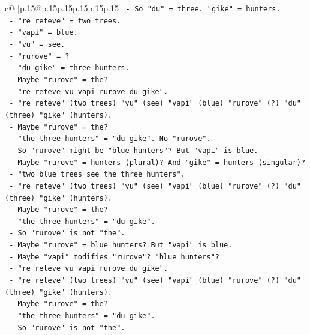 \documentclass{article}
\begin{document}
{\begin{supertabular}{c@{$\;$}|p{.15\linewidth}@{}p{.15\linewidth}p{.15\linewidth}p{.15\linewidth}p{.15\linewidth}p{.15\linewidth}}
{{{\texttt{           {-} So "du" = three. "gike" = hunters.} \\
\texttt{           {-} "re reteve" = two trees.} \\
\texttt{           {-} "vapi" = blue.} \\
\texttt{           {-} "vu" = see.} \\
\texttt{           {-} "rurove" = ?} \\
\texttt{           {-} "du gike" = three hunters.} \\
\texttt{           {-} Maybe "rurove" = the?} \\
\texttt{           {-} "re reteve vu vapi rurove du gike".} \\
\texttt{           {-} "re reteve" (two trees) "vu" (see) "vapi" (blue) "rurove" (?) "du" (three) "gike" (hunters).} \\
\texttt{           {-} Maybe "rurove" = the?} \\
\texttt{           {-} "the three hunters" = "du gike". No "rurove".} \\
\texttt{           {-} So "rurove" might be "blue hunters"? But "vapi" is blue.} \\
\texttt{           {-} Maybe "rurove" = hunters (plural)? And "gike" = hunters (singular)?} \\
\texttt{           {-} "two blue trees see the three hunters".} \\
\texttt{           {-} "re reteve" (two trees) "vu" (see) "vapi" (blue) "rurove" (?) "du" (three) "gike" (hunters).} \\
\texttt{           {-} Maybe "rurove" = the?} \\
\texttt{           {-} "the three hunters" = "du gike".} \\
\texttt{           {-} So "rurove" is not "the".} \\
\texttt{           {-} Maybe "rurove" = blue hunters? But "vapi" is blue.} \\
\texttt{           {-} Maybe "vapi" modifies "rurove"? "blue hunters"?} \\
\texttt{           {-} "re reteve vu vapi rurove du gike".} \\
\texttt{           {-} "re reteve" (two trees) "vu" (see) "vapi" (blue) "rurove" (?) "du" (three) "gike" (hunters).} \\
\texttt{           {-} Maybe "rurove" = the?} \\
\texttt{           {-} "the three hunters" = "du gike".} \\
\texttt{           {-} So "rurove" is not "the".} \\
}}}
\end{supertabular}}
\end{document}
